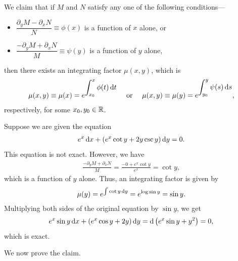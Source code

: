 We claim that if $M$ and $N$ satisfy any one of the following conditions---
\begin{itemize}
    \item $\dfrac{\partial_{y} M - \partial_{x} N}{N} \equiv \phi(x)$ is a function of $x$ alone, or
    \item $\dfrac{-\partial_{y} M + \partial_{x} N}{M} \equiv \psi(y)$ is a function of $y$ alone,
\end{itemize}
then there exists an integrating factor $\mu(x,y)$, which is
\begin{align}
    \mu(x,y) \equiv \mu(x) = e^{\displaystyle\int_{x_{0}}^{x} \phi(t) \, \mathrm{d}t} \quad \text{ or } \quad \mu(x,y) \equiv \mu(y) = e^{\displaystyle\int_{y_{0}}^{y} \psi(s) \, \mathrm{d}s},
\end{align}
respectively, for some $x_{0}, y_{0} \in \mathbb{R}$.

\begin{example}
    Suppose we are given the equation
    \begin{align}
        e^{x} \, \mathrm{d}x + (e^{x} \cot y + 2 y \csc y) \, \mathrm{d}y = 0.
    \end{align}
    This equation is not exact. However, we have
    \begin{align}
        \frac{-\partial_{y} M + \partial_{x} N}{M} = \frac{-0 + e^{x} \cot y}{e^{x}} = \cot y,
    \end{align}
    which is a function of $y$ alone. Thus, an integrating factor is given by
    \begin{align}
        \mu(y) = e^{\int \cot y \, \mathrm{d}y} = e^{\log \sin y} = \sin y.
    \end{align}
    Multiplying both sides of the original equation by $\sin y$, we get
    \begin{align}
        e^{x} \sin y \, \mathrm{d}x + (e^{x} \cos y + 2 y) \, \mathrm{d}y = \mathrm{d}\left( e^{x} \sin y + y^{2} \right) = 0,
    \end{align}
    which is exact.
\end{example}

We now prove the claim.

